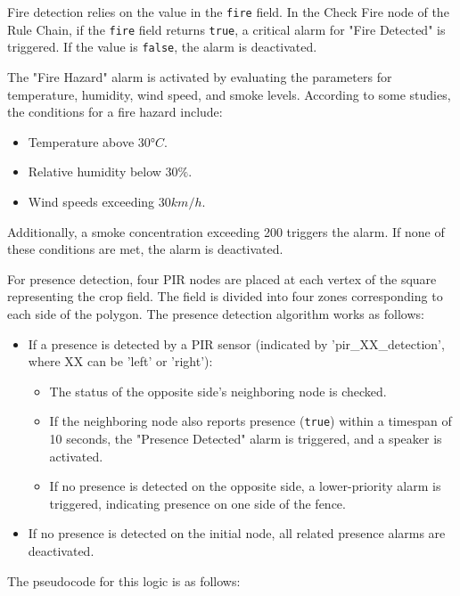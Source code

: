 Fire detection relies on the value in the \texttt{fire} field. In the Check Fire node of the Rule Chain, if the \texttt{fire} field returns \texttt{true}, a critical alarm for "Fire Detected"
is triggered. If the value is \texttt{false}, the alarm is deactivated.

The "Fire Hazard" alarm is activated by evaluating the parameters for temperature, humidity, wind speed, and smoke levels. According to some studies\cite{norma303030tres}, the conditions 
for a fire hazard include:
\begin{itemize}
    \item Temperature above $30$°$C$.
    \item Relative humidity below $30\%$.
    \item Wind speeds exceeding $30 km/h$.
\end{itemize}

Additionally, a smoke concentration exceeding 200  triggers the alarm. If none of these conditions are met, the alarm is deactivated.

For presence detection, four PIR nodes are placed at each vertex of the square representing the crop field. The field is divided into four zones corresponding to each side 
of the polygon. The presence detection algorithm works as follows:
\begin{itemize}
    \item If a presence is detected by a PIR sensor (indicated by 'pir\_XX\_detection', where XX can be 'left' or 'right'):
    \begin{itemize}
        \item The status of the opposite side’s neighboring node is checked.
        \item If the neighboring node also reports presence (\texttt{true}) within a timespan of 10 seconds, the "Presence Detected" alarm is triggered, and a speaker is activated.
        \item If no presence is detected on the opposite side, a lower-priority alarm is triggered, indicating presence on one side of the fence.
    \end{itemize}
    \item If no presence is detected on the initial node, all related presence alarms are deactivated. 
\end{itemize}

The pseudocode for this logic is as follows:


